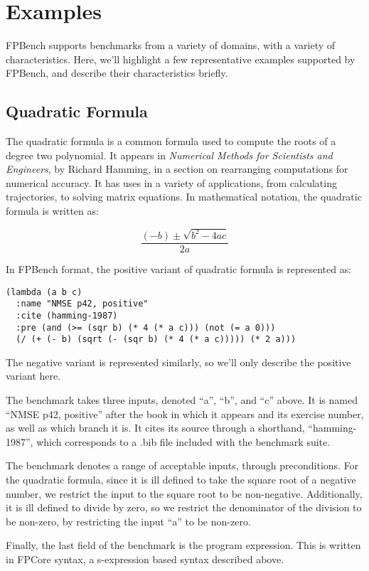 \documentclass[main.tex]{subfiles}
\begin{document}
\section{Examples}

FPBench supports benchmarks from a variety of domains, with a variety
of characteristics. Here, we'll highlight a few representative
examples supported by FPBench, and describe their characteristics
briefly.

\subsection{Quadratic Formula}

The quadratic formula is a common formula used to compute the roots of
a degree two polynomial. It appears in \textit{Numerical Methods for
  Scientists and Engineers}, by Richard Hamming, in a section on
rearranging computations for numerical accuracy. It has uses in a
variety of applications, from calculating trajectories, to solving
matrix equations. In mathematical notation, the quadratic formula is
written as:

\begin{equation}
  \frac{(- b) \pm \sqrt{b^2 - 4ac}}{2a}
\end{equation}

In FPBench format, the positive variant of quadratic formula is
represented as:

\begin{verbatim}
(lambda (a b c)
  :name "NMSE p42, positive"
  :cite (hamming-1987)
  :pre (and (>= (sqr b) (* 4 (* a c))) (not (= a 0)))
  (/ (+ (- b) (sqrt (- (sqr b) (* 4 (* a c))))) (* 2 a)))
\end{verbatim}

The negative variant is represented similarly, so we'll only describe
the positive variant here.

The benchmark takes three inputs, denoted ``a'', ``b'', and ``c''
above. It is named ``NMSE p42, positive'' after the book in which it
appears and its exercise number, as well as which branch it is. It
cites its source through a shorthand, ``hamming-1987'', which
corresponds to a .bib file included with the benchmark suite.

The benchmark denotes a range of acceptable inputs, through
preconditions. For the quadratic formula, since it is ill defined to
take the square root of a negative number, we restrict the input to
the square root to be non-negative. Additionally, it is ill defined to
divide by zero, so we restrict the denominator of the division to be
non-zero, by restricting the input ``a'' to be non-zero.

Finally, the last field of the benchmark is the program
expression. This is written in FPCore syntax, a s-expression based
syntax described above.
\end{document}
